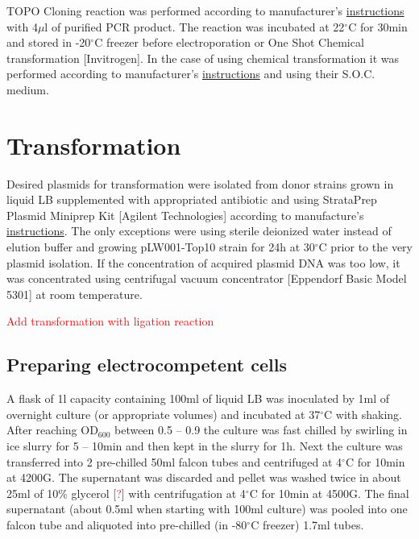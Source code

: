 TOPO\textsuperscript{\textregistered} Cloning reaction was performed according to manufacturer's \href{https://assets.thermofisher.com/TFS-Assets/LSG/manuals/pcr8gwtopo_man.pdf}{instructions} with 4$\mu$l of purified PCR product.
The reaction was incubated at 22$^{\circ}$C for 30min and stored in -20$^{\circ}$C freezer before electroporation or One Shot\textsuperscript{\textregistered} Chemical transformation [Invitrogen].
In the case of using chemical transformation it was performed according to manufacturer's \href{https://assets.thermofisher.com/TFS-Assets/LSG/manuals/pcr8gwtopo_man.pdf}{instructions} and using their S.O.C. medium.

\section{Transformation}
Desired plasmids for transformation were isolated from donor strains grown in liquid LB supplemented with appropriated antibiotic and using StrataPrep Plasmid Miniprep Kit [Agilent Technologies] according to manufacture's \href{https://www.agilent.com/cs/library/usermanuals/public/400766.pdf}{instructions}.
The only exceptions were using sterile deionized water instead of elution buffer and growing pLW001-Top10 strain for 24h at 30$^{\circ}$C prior to the very plasmid isolation.
If the concentration of acquired plasmid DNA was too low, it was concentrated using centrifugal vacuum concentrator [Eppendorf\textsuperscript{\textregistered} Basic Model 5301] at room temperature.

\textcolor{red}{Add transformation with ligation reaction}

\subsection{Preparing electrocompetent cells}
A flask of 1l capacity containing 100ml of liquid LB was inoculated by 1ml of overnight culture (or appropriate volumes) and incubated at 37$^{\circ}$C with shaking.
After reaching OD$_{600}$ between 0.5 -- 0.9 the culture was fast chilled by swirling in ice slurry for 5 -- 10min and then kept in the slurry for 1h.
Next the culture was transferred into 2 pre-chilled 50ml falcon tubes and centrifuged  at 4$^{\circ}$C for 10min at 4200G.
The supernatant was discarded and pellet was washed twice in about 25ml of 10\% glycerol [\textcolor{red}{?}] with centrifugation at 4$^{\circ}$C for 10min at 4500G.
The final supernatant (about 0.5ml when starting with 100ml culture) was pooled into one falcon tube and aliquoted into pre-chilled (in -80$^{\circ}$C freezer) 1.7ml tubes.

